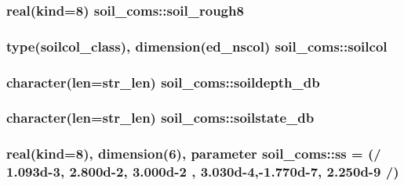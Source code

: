 \subsubsection[{\texorpdfstring{soil\+\_\+rough8}{soil_rough8}}]{\setlength{\rightskip}{0pt plus 5cm}real(kind=8) soil\+\_\+coms\+::soil\+\_\+rough8}\hypertarget{namespacesoil__coms_a33d9bb430514fde199b526e39479b7a4}{}\label{namespacesoil__coms_a33d9bb430514fde199b526e39479b7a4}
\subsubsection[{\texorpdfstring{soilcol}{soilcol}}]{\setlength{\rightskip}{0pt plus 5cm}type({\bf soilcol\+\_\+class}), dimension({\bf ed\+\_\+nscol}) soil\+\_\+coms\+::soilcol}\hypertarget{namespacesoil__coms_a90e160d33d6fa2c289ce1742bc852139}{}\label{namespacesoil__coms_a90e160d33d6fa2c289ce1742bc852139}
\subsubsection[{\texorpdfstring{soildepth\+\_\+db}{soildepth_db}}]{\setlength{\rightskip}{0pt plus 5cm}character(len=str\+\_\+len) soil\+\_\+coms\+::soildepth\+\_\+db}\hypertarget{namespacesoil__coms_a5d607eec910da5341af027871e06a16e}{}\label{namespacesoil__coms_a5d607eec910da5341af027871e06a16e}
\subsubsection[{\texorpdfstring{soilstate\+\_\+db}{soilstate_db}}]{\setlength{\rightskip}{0pt plus 5cm}character(len=str\+\_\+len) soil\+\_\+coms\+::soilstate\+\_\+db}\hypertarget{namespacesoil__coms_a7a54852974f4d42c4e4bfbd1145a3e44}{}\label{namespacesoil__coms_a7a54852974f4d42c4e4bfbd1145a3e44}
\subsubsection[{\texorpdfstring{ss}{ss}}]{\setlength{\rightskip}{0pt plus 5cm}real(kind=8), dimension(6), parameter soil\+\_\+coms\+::ss = (/ 1.\+093d-\/3, 2.\+800d-\/2, 3.\+000d-\/2 , 3.\+030d-\/4,-\/1.\+770d-\/7, 2.\+250d-\/9 /)}\hypertarget{namespacesoil__coms_a39d9ab50ccb8cb1642f28ba113c2719e}{}\label{namespacesoil__coms_a39d9ab50ccb8cb1642f28ba113c2719e}
